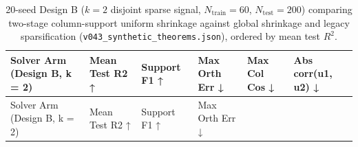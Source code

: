 \documentclass[
  10pt,
  letterpaper,
]{report}
\begin{document}
\begin{longtable}[]{@{}
  >{\raggedright\arraybackslash}p{}
  >{\raggedleft\arraybackslash}p{}
  >{\raggedleft\arraybackslash}p{}
  >{\raggedleft\arraybackslash}p{}
  >{\raggedleft\arraybackslash}p{}
  >{\raggedleft\arraybackslash}p{}@{}}
\caption{20-seed Design B (\(k = 2\) disjoint sparse signal,
\(N_{\text{train}} = 60\), \(N_{\text{test}} = 200\)) comparing
two-stage column-support uniform shrinkage against global shrinkage and
legacy sparsification (\protect\texttt{v043\_synthetic\_theorems.json}),
ordered by mean test \(R^2\).}\label{tbl-v043-design-b}\tabularnewline
\toprule\noalign{}
\begin{minipage}[b]{\linewidth}\raggedright
Solver Arm (Design B, k = 2)
\end{minipage} & \begin{minipage}[b]{\linewidth}\raggedleft
Mean Test R2 ↑
\end{minipage} & \begin{minipage}[b]{\linewidth}\raggedleft
Support F1 ↑
\end{minipage} & \begin{minipage}[b]{\linewidth}\raggedleft
Max Orth Err ↓
\end{minipage} & \begin{minipage}[b]{\linewidth}\raggedleft
Max Col Cos ↓
\end{minipage} & \begin{minipage}[b]{\linewidth}\raggedleft
Abs corr(u1, u2) ↓
\end{minipage} \\
\midrule\noalign{}
\endfirsthead
\toprule\noalign{}
\begin{minipage}[b]{\linewidth}\raggedright
Solver Arm (Design B, k = 2)
\end{minipage} & \begin{minipage}[b]{\linewidth}\raggedleft
Mean Test R2 ↑
\end{minipage} & \begin{minipage}[b]{\linewidth}\raggedleft
Support F1 ↑
\end{minipage} & \begin{minipage}[b]{\linewidth}\raggedleft
Max Orth Err ↓
\end{minipage} & \begin{minipage}[b]{\linewidth}\raggedleft

\end{minipage}
\end{longtable}
\end{document}
